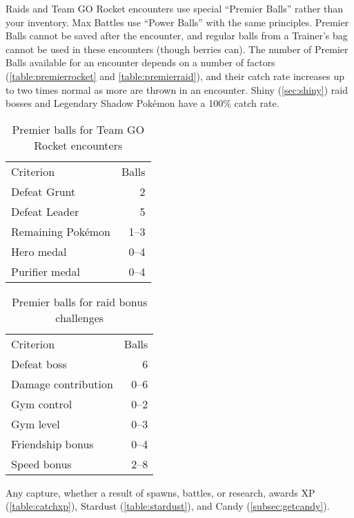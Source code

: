 Raids and Team GO Rocket encounters use special ``Premier Balls'' rather than your inventory.
Max Battles use ``Power Balls'' with the same principles.
Premier Balls cannot be saved after the encounter, and regular balls from
  a Trainer's bag cannot be used in these encounters (though berries can).
The number of Premier Balls available for an encounter depends on a number of factors (\autoref{table:premierrocket}
  and \autoref{table:premierraid}), and their catch rate increases up to two times normal as more are thrown in an encounter.
Shiny (\autoref{sec:shiny}) raid bosses and Legendary Shadow Pokémon have a 100\% catch rate.
\begin{table}
\centering
\begin{tabular}{lr}
Criterion & Balls\\
\Midrule
Defeat Grunt & 2\\
Defeat Leader & 5\\
Remaining Pokémon & 1--3\\
Hero medal & 0--4\\
Purifier medal & 0--4\\
\end{tabular}
  \caption{Premier balls for Team GO Rocket encounters\label{table:premierrocket}}
\end{table}
\begin{table}
\centering
\begin{tabular}{lr}
Criterion & Balls\\
\Midrule
  Defeat boss & 6\\
  Damage contribution & 0--6\\
  Gym control & 0--2\\
  Gym level & 0--3\\
  Friendship bonus & 0--4\\
  Speed bonus & 2--8\\
\end{tabular}
  \caption{Premier balls for raid bonus challenges\label{table:premierraid}}
\end{table}
Any capture, whether a result of spawns, battles, or research, awards XP (\autoref{table:catchxp}),
 Stardust (\autoref{table:stardust}), and Candy (\autoref{subsec:getcandy}).
